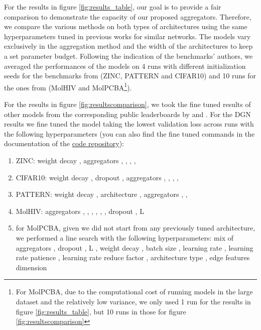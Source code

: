 \documentclass{article} \usepackage{arxiv,times}
\begin{document}
For the results in figure \ref{fig:results_table}, our goal is to provide a fair comparison to demonstrate the capacity of our proposed aggregators. Therefore, we compare the various methods on both types of architectures using the same hyperparameters tuned in previous works \cite{corso2020principal} for similar networks. The models vary exclusively in the aggregation method and the width of the architectures to keep a set parameter budget. Following the indication of the benchmarks' authors, we averaged the performances of the models on 4 runs with different initialization seeds for the benchmarks from \cite{dwivedi2020benchmarking} (ZINC, PATTERN and CIFAR10) and 10 runs for the ones from \cite{hu2020open} (MolHIV and MolPCBA\footnote{For MolPCBA, due to the computational cost of running models in the large dataset and the relatively low variance, we only used 1 run for the results in figure \ref{fig:results_table}, but 10 runs in those for figure \ref{fig:resultscomparison}}).

For the results in figure \ref{fig:resultscomparison}, we took the fine tuned results of other models from the corresponding public leaderboards by \cite{dwivedi2020benchmarking} and \cite{hu2020open}. For the DGN results we fine tuned the model taking the lowest validation loss across runs with the following hyperparameters (you can also find the fine tuned commands in the documentation of the \href{https://github.com/Saro00/DGN}{code repository}):

\begin{enumerate}
    \item ZINC: weight decay , aggregators , , , ,  

    \item CIFAR10: weight decay , dropout , aggregators , , , , 

    \item PATTERN: weight decay , architecture , aggregators , ,  

    \item MolHIV: aggregators , , , , , , dropout , L 
    
    \item for MolPCBA, given we did not start from any previously tuned architecture, we performed a line search with the following hyperparameters:  mix of aggregators , dropout , L , weight decay , batch size , learning rate , learning rate patience , learning rate reduce factor , architecture type , edge features dimension 

\end{enumerate}
\end{document}
